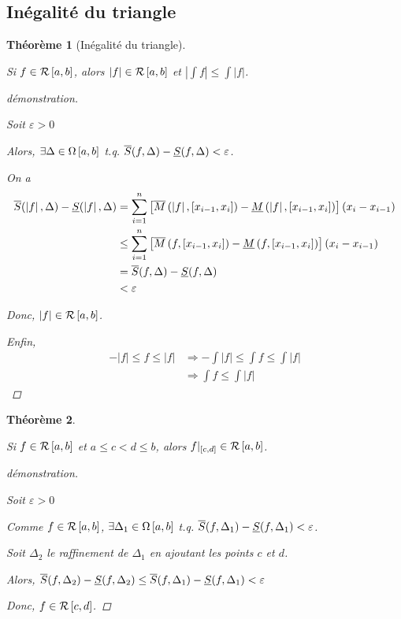 \documentclass{report}
\newcommand*{\abs}[1]{\left| #1 \right|}
\newcommand*{\eps}{\varepsilon}
\newtheorem*{thm}{Th\'eor\`eme}
\theoremstyle{definition}
\theoremstyle{remark}
\begin{document}
	\subsection{In\'egalit\'e du triangle}
	\begin{thm}[In\'egalit\'e du triangle]
		~

		Si $f \in \riemann$, alors $\abs{f} \in \riemann$ et $\abs{\int f} \leq \int\abs{f}$.
		\begin{proof}[d\'emonstration]~

			Soit $\eps>0$

			Alors, $\exists\Delta \in \partitions$ t.q. $\ssup{f}-\sinf{f}<\eps$.

			On a
			\begin{align*}
				\ssup{\abs{f}}-\sinf{\abs{f}}&= \sum_{i=1}^{n}\left[ \msup{\abs{f}}[x_{i-1},x_i] - \minf{\abs{f}}[x_{i-1},x_i] \right] \left( x_i-x_{i-1} \right)\\
				&\leq \sum_{i=1}^{n}\left[ \msup{f}[x_{i-1},x_i] - \minf{f}[x_{i-1},x_i] \right] \left( x_i-x_{i-1} \right)\\
				&= \ssup{f}-\sinf{f}\\
				&< \eps
			\end{align*}

			Donc, $\abs{f} \in \riemann$.

			Enfin,
			\begin{align*}
				-\abs{f} \leq f \leq \abs{f}&\Rightarrow -\int\abs{f} \leq \int f \leq \int\abs{f}\\
				&\Rightarrow \int f \leq \int\abs{f}
			\end{align*}
		\end{proof}
	\end{thm}
	\begin{thm}
		~

		Si $f \in \riemann$ et $a \leq c < d \leq b$, alors $f|_{[c,d]} \in \riemann$.
		\begin{proof}[d\'emonstration]~

			Soit $\eps>0$

			Comme $f \in \riemann$, $\exists\Delta_1 \in \partitions$ t.q. $\ssup{f}[\Delta_1]-\sinf{f}[\Delta_1] < \eps$.

			Soit $\Delta_2$ le raffinement de $\Delta_1$ en ajoutant les points $c$ et $d$.

			Alors, $\ssup{f}[\Delta_2]-\sinf{f}[\Delta_2] \leq \ssup{f}[\Delta_1]-\sinf{f}[\Delta_1] < \eps$

			Donc, $f \in \riemann[c,d]$.
		\end{proof}
	\end{thm}
\end{document}
